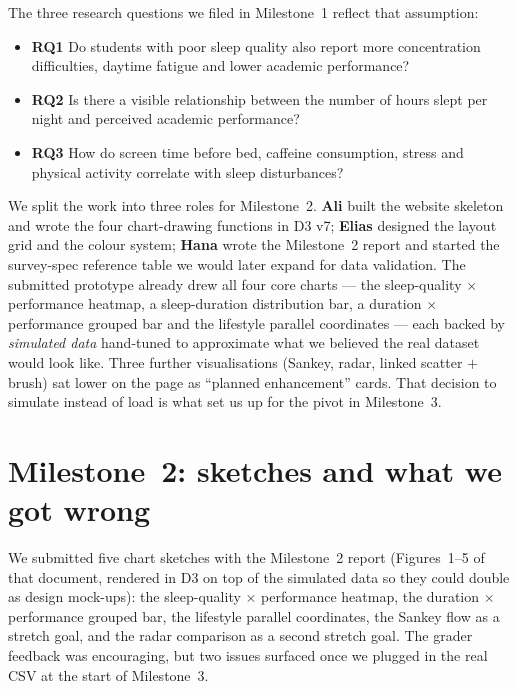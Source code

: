 \documentclass[11pt,a4paper]{article}
\newcommand{\rqtag}[1]{\textcolor{brand}{\sffamily\bfseries\footnotesize #1}}
\begin{document}
The three research questions we filed in Milestone~1 reflect that assumption:

\begin{itemize}
  \item \rqtag{RQ1} Do students with poor sleep quality also report more concentration difficulties, daytime fatigue and lower academic performance?
  \item \rqtag{RQ2} Is there a visible relationship between the number of hours slept per night and perceived academic performance?
  \item \rqtag{RQ3} How do screen time before bed, caffeine consumption, stress and physical activity correlate with sleep disturbances?
\end{itemize}

We split the work into three roles for Milestone~2. \textbf{Ali} built the website skeleton and wrote the four chart-drawing functions in D3 v7; \textbf{Elias} designed the layout grid and the colour system; \textbf{Hana} wrote the Milestone~2 report and started the survey-spec reference table we would later expand for data validation. The submitted prototype already drew all four core charts --- the sleep-quality $\times$ performance heatmap, a sleep-duration distribution bar, a duration $\times$ performance grouped bar and the lifestyle parallel coordinates --- each backed by \emph{simulated data} hand-tuned to approximate what we believed the real dataset would look like. Three further visualisations (Sankey, radar, linked scatter $+$ brush) sat lower on the page as ``planned enhancement'' cards. That decision to simulate instead of load is what set us up for the pivot in Milestone~3.

\section{Milestone~2: sketches and what we got wrong}
\label{sec:m2}

We submitted five chart sketches with the Milestone~2 report (Figures~1--5 of that document, rendered in D3 on top of the simulated data so they could double as design mock-ups): the sleep-quality $\times$ performance heatmap, the duration $\times$ performance grouped bar, the lifestyle parallel coordinates, the Sankey flow as a stretch goal, and the radar comparison as a second stretch goal. The grader feedback was encouraging, but two issues surfaced once we plugged in the real CSV at the start of Milestone~3.
\end{document}
